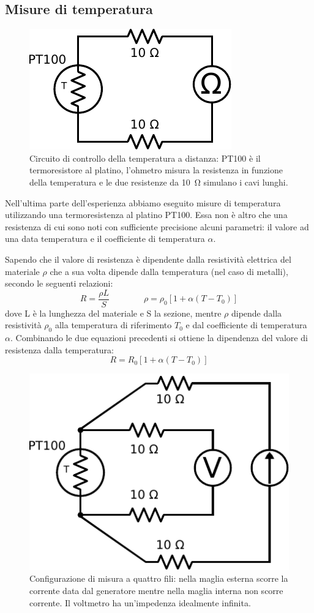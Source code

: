 \subsection{Misure di temperatura}

\begin{figure}
\centering
\includegraphics[width=.25\textwidth]{../E05/latex/c_PT100_2wire.pdf}
\caption{Circuito di controllo della temperatura a distanza: PT100 è il termoresistore al platino, l'ohmetro misura la resistenza in funzione della temperatura e le due resistenze da \SI{10}{\ohm} simulano i cavi lunghi.}
\label{cir5:2wire}
\end{figure}

Nell'ultima parte dell'esperienza abbiamo eseguito misure di temperatura utilizzando una termoresistenza al platino PT100.
Essa non è altro che una resistenza di cui sono noti con sufficiente precisione alcuni parametri: il valore ad una data temperatura e il coefficiente di temperatura $\alpha$.

Sapendo che il valore di resistenza è dipendente dalla resistività elettrica del materiale $\rho$ che a sua volta dipende dalla temperatura (nel caso di metalli), secondo le seguenti relazioni:
	$$	R = \frac{\rho L}{S}
			\qquad \qquad
		\rho = \rho_0 \left[ 1 + \alpha \left( T - T_0 \right) \right]$$
dove L è la lunghezza del materiale e S la sezione, mentre $\rho$ dipende dalla resistività $\rho_0$ alla temperatura di riferimento $T_0$ e dal coefficiente di temperatura $\alpha$.
Combinando le due equazioni precedenti si ottiene la dipendenza del valore di resistenza dalla temperatura:
\begin{equation}
R = R_0 \left[ 1 + \alpha \left( T - T_0 \right) \right]
\end{equation}

\begin{figure}
\centering
\includegraphics[width=.3\textwidth]{../E05/latex/c_PT100_4wire.pdf}
\caption{Configurazione di misura a quattro fili: nella maglia esterna scorre la corrente data dal generatore mentre nella maglia interna non scorre corrente. Il voltmetro ha un'impedenza idealmente infinita.}
\label{cir5:4wire}
\end{figure}

